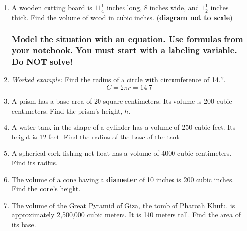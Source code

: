 \begin{enumerate}
  \item  A wooden cutting board is $11 \frac{1}{4}$ inches long, 8 inches wide, and $1 \frac{1}{2}$ inches thick. Find the volume of wood in cubic inches. \hfill (\textbf{diagram not to scale})
    \begin{flushright}
      \end{flushright} \vspace{2cm}

\newpage
\subsubsection*{Model the situation with an equation. Use formulas from your notebook. You must start with a labeling variable. \hfill Do NOT solve!}

\item \emph{Worked example:} Find the radius of a circle with circumference of 14.7.
\[C=2\pi r=14.7\]

\item A prism has a base area of 20 square centimeters. Its volume is 200 cubic centimeters. Find the prism's height, $h$. \vspace{2cm}

\item A water tank in the shape of a cylinder has a volume of 250 cubic feet. Its height is 12 feet. Find the radius of the base of the tank. \vspace{2cm}

\item A spherical cork fishing net float has a volume of 4000 cubic centimeters. Find its radius. \vspace{2cm}

\item The volume of a cone having a \textbf{diameter} of 10 inches is 200 cubic inches. Find the cone's height. \vspace{2cm}

\item The volume of the Great Pyramid of Giza, the tomb of Pharoah Khufu, is approximately 2,500,000 cubic meters. It is 140 meters tall. Find the area of its base.  \vspace{2cm}


\end{enumerate}
